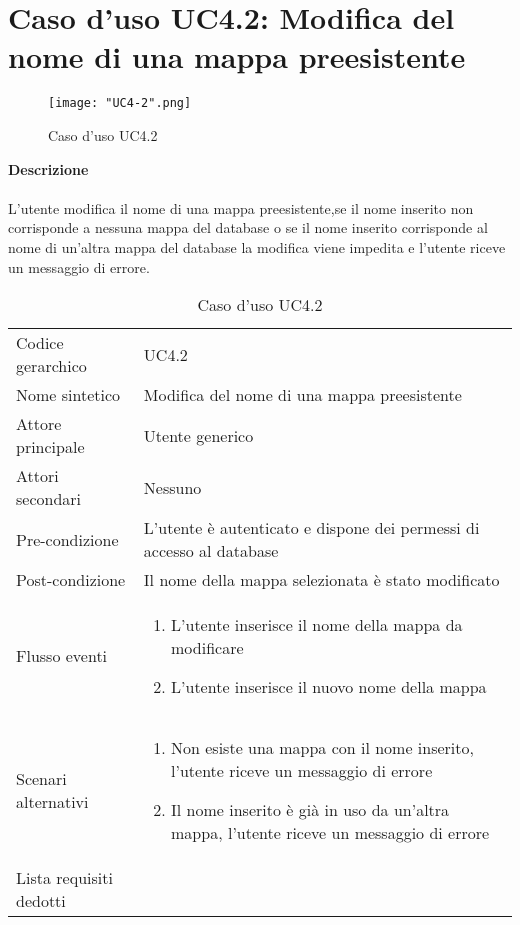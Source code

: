 \documentclass[a4paper]{report}
\begin{document}
	  \section{Caso d'uso UC4.2: Modifica del nome di una mappa preesistente}
	 \begin{figure}[H]
			\centering
			\texttt{[image: "UC4-2".png]}
			\caption{Caso d'uso UC4.2}
		\end{figure}
	 \textbf{Descrizione} \\ \\
	 L'utente modifica il nome di una mappa preesistente,se il nome inserito non corrisponde a nessuna
	 mappa del database o se il nome inserito corrisponde al nome di un'altra mappa del database la
	 modifica viene impedita e l'utente riceve un messaggio di errore.
		\begin{table}[H]
		\begin{tabularx}{\textwidth}{X | X}\toprule
			\rowcolor{orange!65}Codice gerarchico & UC4.2 \\
			Nome sintetico & Modifica del nome di una mappa preesistente \\
			\rowcolor{orange!65}Attore principale & Utente generico\\
			Attori secondari & Nessuno \\
			\rowcolor{orange!65}Pre-condizione & L'utente è autenticato e dispone dei permessi di accesso
			al database\\
			Post-condizione & Il nome della mappa selezionata è stato modificato\\
			\rowcolor{orange!65}Flusso eventi & \begin{enumerate}
			\item L'utente inserisce il nome della mappa da modificare
			\item L'utente inserisce il nuovo nome della mappa
			\end{enumerate} \\
			Scenari alternativi & \begin{enumerate}
			\item Non esiste una mappa con il nome inserito, l'utente riceve un messaggio di errore
			\item Il nome inserito è già in uso da un'altra mappa, l'utente riceve un messaggio di errore
			\end{enumerate} \\
			\rowcolor{orange!65}Lista requisiti dedotti & \\
			\bottomrule
		\end{tabularx}
		\caption{Caso d'uso UC4.2}
	 \end{table}
\end{document}
